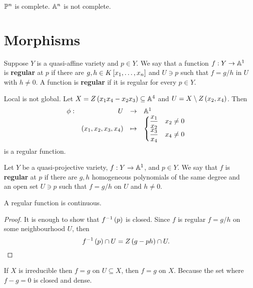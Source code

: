 \begin{example}
$ \P^n $ is complete. $ \A^n $ is not complete.
\end{example}

\pagebreak

\section{Morphisms}

\begin{definition}
Suppose $ Y $ is a quasi-affine variety and $ p \in Y $. We say that a function $ f : Y \to \A^1 $ is \textbf{regular} at $ p $ if there are $ g, h \in K\sb{x_1, \dots, x_n} $ and $ U \ni p $ such that $ f = g / h $ in $ U $ with $ h \ne 0 $. A function is \textbf{regular} if it is regular for every $ p \in Y $.
\end{definition}

\begin{example}
Local is not global. Let $ X = Z\rb{x_1x_4 - x_2x_3} \subseteq \A^4 $ and $ U = X \setminus Z\rb{x_2, x_4} $. Then
$$ \function[\phi]{U}{\A^1}{\rb{x_1, x_2, x_3, x_4}}{
\begin{cases}
\dfrac{x_1}{x_2} & x_2 \ne 0 \\
\dfrac{x_3}{x_4} & x_4 \ne 0
\end{cases}
} $$
is a regular function.
\end{example}

\begin{definition}
Let $ Y $ be a quasi-projective variety, $ f : Y \to \A^1 $, and $ p \in Y $. We say that $ f $ is \textbf{regular} at $ p $ if there are $ g, h $ homogeneous polynomials of the same degree and an open set $ U \ni p $ such that $ f = g / h $ on $ U $ and $ h \ne 0 $.
\end{definition}

\begin{lemma}
A regular function is continuous.
\end{lemma}

\begin{proof}
It is enough to show that $ f^{-1}\rb{p} $ is closed. Since $ f $ is regular $ f = g / h $ on some neighbourhood $ U $, then
$$ f^{-1}\rb{p} \cap U = Z\rb{g - ph} \cap U. $$
\end{proof}

\begin{remark}
If $ X $ is irreducible then $ f = g $ on $ U \subseteq X $, then $ f = g $ on $ X $. Because the set where $ f - g = 0 $ is closed and dense.
\end{remark}

